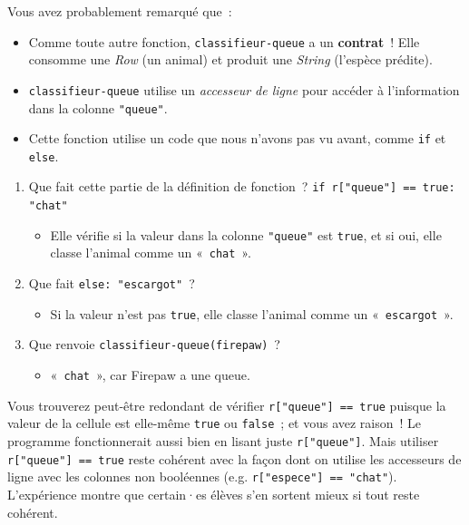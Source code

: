 \documentclass[12pt,a4paper]{article}
\begin{document}
\begin{thinkbox}
  Vous avez probablement remarqué que~:
  \begin{itemize}
    \item Comme toute autre fonction, \texttt{classifieur-queue} a un \textbf{contrat}~! Elle consomme une \emph{Row} (un animal) et produit une \emph{String} (l'espèce prédite).
    \item \texttt{classifieur-queue} utilise un \emph{accesseur de ligne} pour accéder à l'information dans la colonne \texttt{"queue"}.
    \item Cette fonction utilise un code que nous n'avons pas vu avant, comme \texttt{if} et \texttt{else}.
  \end{itemize}
\end{thinkbox}

\begin{activitybox}
  \begin{enumerate}[leftmargin=*]
    \item Que fait cette partie de la définition de fonction~?
    \texttt{if r["queue"] == true: "chat"}
    \begin{itemize}
      \item Elle vérifie si la valeur dans la colonne \texttt{"queue"} est \texttt{true}, et si oui, elle classe l'animal comme un «~\texttt{chat}~».
    \end{itemize}
    \item Que fait \texttt{else: "escargot"}~?
    \begin{itemize}
      \item Si la valeur n'est pas \texttt{true}, elle classe l'animal comme un «~\texttt{escargot}~».
    \end{itemize}
    \item Que renvoie \texttt{classifieur-queue(firepaw)}~?
    \begin{itemize}
      \item «~\texttt{chat}~», car Firepaw a une queue.
    \end{itemize}
  \end{enumerate}
\end{activitybox}

\begin{instructornotes}
  Vous trouverez peut-être redondant de vérifier \texttt{r["queue"] == true} puisque la valeur de la cellule est elle-même \texttt{true} ou \texttt{false}~; et vous avez raison~! Le programme fonctionnerait aussi bien en lisant juste \texttt{r["queue"]}. Mais utiliser \texttt{r["queue"] == true} reste cohérent avec la façon dont on utilise les accesseurs de ligne avec les colonnes non booléennes (e.g. \texttt{r["espece"] == "chat"}). L'expérience montre que certain·es élèves s'en sortent mieux si tout reste cohérent.
\end{instructornotes}
\end{document}
